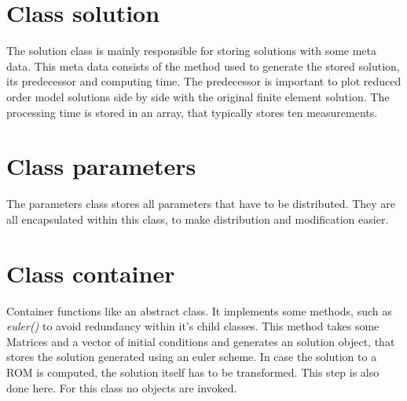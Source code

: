 \section{Class solution}
The solution class is mainly responsible for storing solutions with some meta data.
This meta data consists of the method used to generate the stored solution, its predecessor and computing time.
The predecessor is important to plot reduced order model solutions side by side with the original finite element solution.
The processing time is stored in an array, that typically stores ten measurements.

\section{Class parameters}
The parameters class stores all parameters that have to be distributed.
They are all encapsulated within this class, to make distribution and modification easier.

\section{Class container}
Container functions like an abstract class.
It implements some methods, such as \textit{euler()} to avoid redundancy within it's child classes.
This method takes some Matrices and a vector of initial conditions and generates an solution object, that stores the solution generated using an euler scheme.
In case the solution to a ROM is computed, the solution itself has to be transformed.
This step is also done here.
For this class no objects are invoked.

